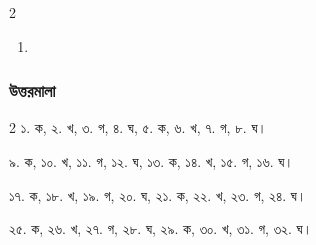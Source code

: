 \begin{multicols}{2}
\begin{enumerate}
\item{}
\end{enumerate}\end{multicols}
\subsubsection*{উত্তরমালা}
\begin{multicols}{2}
১. ক, ২. খ, ৩. গ, ৪. ঘ, ৫. ক, ৬. খ, ৭. গ, ৮. ঘ।\par
৯. ক, ১০. খ, ১১. গ, ১২. ঘ, ১৩. ক, ১৪. খ, ১৫. গ, ১৬. ঘ।\par
১৭. ক, ১৮. খ, ১৯. গ, ২০. ঘ, ২১. ক, ২২. খ, ২৩. গ, ২৪. ঘ।\par
২৫. ক, ২৬. খ, ২৭. গ, ২৮. ঘ, ২৯. ক, ৩০. খ, ৩১. গ, ৩২. ঘ।\par
\end{multicols}
